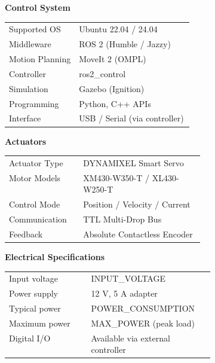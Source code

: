 \documentclass[a4paper,landscape,10pt]{article}
\newcommand{\sectitle}[1]{
    \vspace{0.4cm}
    \colorbox{rowcolor}{
        \parbox{\linewidth}{
            \textbf{\textcolor{maincolor}{#1}}
        }
    }
    \vspace{0.2cm}
}
\begin{document}
\begin{multicols}{3}
\vfill\null
\pagebreak

\sectitle{Control System}

\colorbox{rowcolor}{
\parbox{\linewidth}{
\begin{tabularx}{\linewidth}{>{\raggedright\arraybackslash}p{0.38\linewidth} X}
Supported OS & Ubuntu 22.04 / 24.04 \\
Middleware & ROS 2 (Humble / Jazzy) \\
Motion Planning & MoveIt 2 (OMPL) \\
Controller & ros2\_control \\
Simulation & Gazebo (Ignition) \\
Programming & Python, C++ APIs \\
Interface & USB / Serial (via controller) \\
\end{tabularx}
}
}

\sectitle{Actuators}

\colorbox{rowcolor}{
\parbox{\linewidth}{
\begin{tabularx}{\linewidth}{>{\raggedright\arraybackslash}p{0.38\linewidth} X}
Actuator Type & DYNAMIXEL Smart Servo \\
Motor Models & XM430-W350-T / XL430-W250-T \\
Control Mode & Position / Velocity / Current \\
Communication & TTL Multi-Drop Bus \\
Feedback & Absolute Contactless Encoder \\
\end{tabularx}
}
}

\sectitle{Electrical Specifications}

\colorbox{rowcolor}{
\parbox{\linewidth}{
\begin{tabularx}{\linewidth}{>{\raggedright\arraybackslash}p{0.4\linewidth} X}
Input voltage & {{INPUT_VOLTAGE}} \\
Power supply & 12 V, 5 A adapter \\
Typical power & {{POWER_CONSUMPTION}} \\
Maximum power & {{MAX_POWER}} (peak load) \\
Digital I/O & Available via external controller\\
\end{tabularx}
}
}


\end{multicols}
\end{document}
